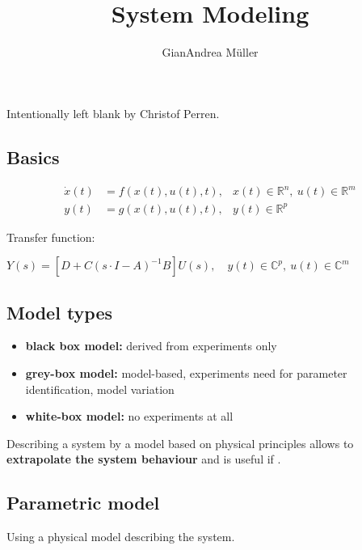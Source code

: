 \documentclass[10pt,a4paper]{scrartcl}
\title{System Modeling}
\author{GianAndrea Müller}
\begin{document}
\begin{multicols*}{4}
\maketitle
\tableofcontents
\end{multicols*}

\newpage

Intentionally left blank by Christof Perren.

\newpage

\begin{multicols*}{3}

\section{Basics}


\begin{align*}
\dot{x}(t)&=f(x(t),u(t),t),&x(t)\in\mathbb{R}^n,\ u(t)\in\mathbb{R}^m\\
y(t)&=g(x(t),u(t),t),&y(t)\in\mathbb{R}^p
\end{align*}


Transfer function:

\small
$Y(s)=\left[D+C(s\cdot I-A)^{-1}B\right]U(s),\quad y(t)\in\mathbb{C}^p,\ u(t)\in\mathbb{C}^m$\normalsize

\subsection{Model types}

\begin{itemize}
\item \textbf{black box model:} derived from experiments only
\item \textbf{grey-box model:} model-based, experiments need for parameter identification, model variation
\item \textbf{white-box model:} no experiments at all
\end{itemize}

Describing a system by a model based on physical principles allows to \textbf{extrapolate the system behaviour} and is useful if .

\subsection{Parametric model}

Using a physical model describing the system.


\end{multicols*}
\end{document}
